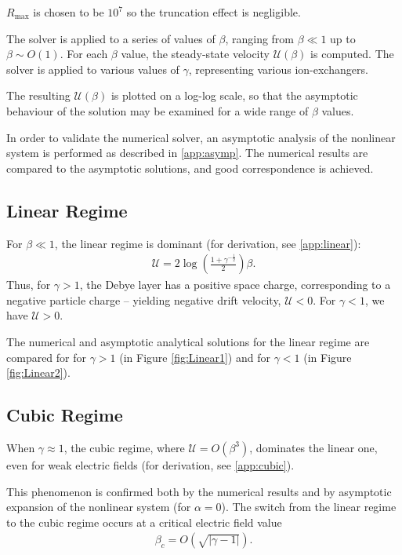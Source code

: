 \documentclass[final]{elsarticle}
\newcommand{\pars}[1]{\left(#1\right)}
\newcommand\cU{\mathscr{U}}
\begin{document}
$R_{\max}$ is chosen to be $10^{7}$ so the truncation effect is negligible.

The solver is applied to a series of values of $\beta$, ranging 
from $\beta \ll 1$ up to $\beta \sim O(1)$.
For each $\beta$ value, the steady-state velocity $\cU(\beta)$ is computed. The solver
is applied to various values of $\gamma$, representing various ion-exchangers.

The resulting $\cU(\beta)$ is plotted on a log-log scale, so that the asymptotic behaviour
of the solution may be examined for a wide range of $\beta$ values.

In order to validate the numerical solver, an asymptotic analysis of the nonlinear system
is performed as described in \ref{app:asymp}. The numerical results are compared 
to the asymptotic solutions, and good correspondence is achieved.

\subsection{Linear Regime}
For $\beta \ll 1$, the linear regime is dominant (for derivation, see \ref{app:linear}):
\begin{eqnarray*}
\cU = 2\log\pars{\frac{1 + \gamma^{-\frac{1}{2}}}{2}}\beta.
\end{eqnarray*}
Thus, for $\gamma > 1$, the Debye layer has a positive space charge, corresponding to a negative
particle charge -- yielding negative drift velocity, $\cU < 0$. 
For $\gamma < 1$, we have $\cU > 0$.

The numerical and asymptotic analytical solutions for the linear regime are compared for 
for $\gamma > 1$ (in Figure \ref{fig:Linear1})  
and for $\gamma < 1$ (in Figure \ref{fig:Linear2}).

\subsection{Cubic Regime}
When $\gamma \approx 1$, the cubic regime, where $\cU = O(\beta^3)$, 
dominates the linear one, even for weak electric fields
(for derivation, see \ref{app:cubic}). 

This phenomenon is confirmed both by the numerical
results and by asymptotic expansion of the nonlinear system (for $\alpha=0$).
The switch from the linear regime to the cubic regime occurs at a critical electric
field value
\begin{eqnarray*}
\beta_c = O(\sqrt{|\gamma - 1|}).
\end{eqnarray*}
\end{document}
